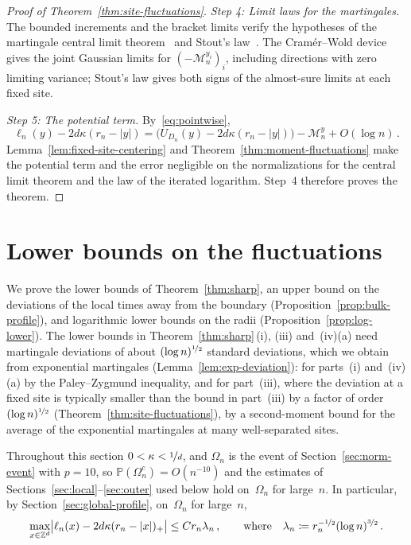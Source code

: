 \documentclass[11pt]{amsart}
\theoremstyle{plain}
\theoremstyle{definition}
\newcommand{\Z}{\mathbb Z}
\renewcommand{\P}{\mathbb P}
\newcommand{\drift}{\kappa}
\newcommand{\nf}{\nicefrac}
\numberwithin{equation}{section}
\begin{document}
\begin{proof}[Proof of Theorem~\ref{thm:site-fluctuations}]
\emph{Step 4: Limit laws for the martingales.} The bounded increments and the bracket limits verify the hypotheses of the martingale central limit theorem~\citep[Corollary~3.1]{HallHeyde1980} and Stout's law~\citep{Stout1970}. The Cram\'er--Wold device gives the joint Gaussian limits for $(-\mathcal M_n^{y_i})_i$, including directions with zero limiting variance; Stout's law gives both signs of the almost-sure limits at each fixed site.

\emph{Step 5: The potential term.} By~\eqref{eq:pointwise},
\begin{equation*}
\ell_n(y)-2d\drift(r_n-|y|)=\bigl(U_{D_n}(y)-2d\drift(r_n-|y|)\bigr)-\mathcal M_n^y+O(\log n)\, .
\end{equation*}
Lemma~\ref{lem:fixed-site-centering} and Theorem~\ref{thm:moment-fluctuations} make the potential term and the error negligible on the normalizations for the central limit theorem and the law of the iterated logarithm. Step~4 therefore proves the theorem.
\end{proof}

\section{Lower bounds on the fluctuations}\label{sec:lower}

We prove the lower bounds of Theorem~\ref{thm:sharp}, an upper bound on the deviations of the local times away from the boundary (Proposition~\ref{prop:bulk-profile}), and logarithmic lower bounds on the radii (Proposition~\ref{prop:log-lower}). The lower bounds in Theorem~\ref{thm:sharp}\,(i), (iii) and~(iv)(a) need martingale deviations of about $(\log n)^{\nf12}$ standard deviations, which we obtain from exponential martingales (Lemma~\ref{lem:exp-deviation}): for parts~(i) and~(iv)(a) by the Paley--Zygmund inequality, and for part~(iii), where the deviation at a fixed site is typically smaller than the bound in part~(iii) by a factor of order~$(\log n)^{\nf12}$ (Theorem~\ref{thm:site-fluctuations}), by a second-moment bound for the average of the exponential martingales at many well-separated sites.

Throughout this section $0<\drift<\nf1d$, and $\Omega_n$ is the event of Section~\ref{sec:norm-event} with $p=10$, so $\P(\Omega_n^c)=O(n^{-10})$ and the estimates of Sections~\ref{sec:local}--\ref{sec:outer} used below hold on~$\Omega_n$ for large~$n$. In particular, by Section~\ref{sec:global-profile}, on~$\Omega_n$ for large~$n$,
\begin{equation}\label{eq:lower-local-error}
\max_{x\in\Z^d}\bigl|\ell_n(x)-2d\drift(r_n-|x|)_+\bigr|\leq Cr_n\lambda_n\, ,\qquad\text{where}\quad\lambda_n\coloneqq r_n^{-\nf12}(\log n)^{\nf32}\, .
\end{equation}
\end{document}

